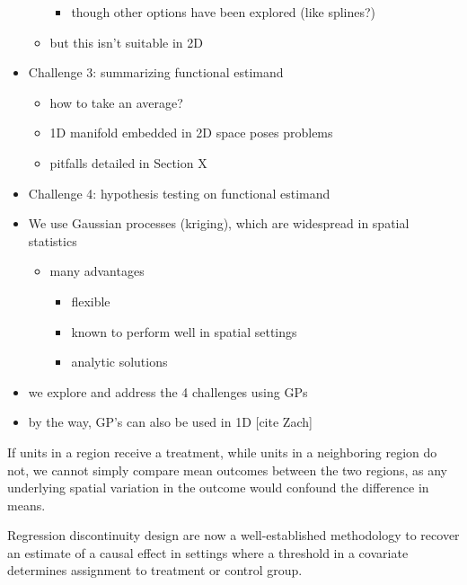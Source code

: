 \documentclass[letter]{article}
\providecommand{\tightlist}{%
      \setlength{\itemsep}{0pt}\setlength{\parskip}{0pt}}
\providecommand{\tightlist}{%
  	  \setlength{\itemsep}{0pt}\setlength{\parskip}{0pt}}
\begin{document}
\begin{itemize}
\begin{itemize}
    \begin{itemize}
    \tightlist
    \item
      though other options have been explored (like splines?)
    \end{itemize}
  \item
    but this isn't suitable in 2D
  \end{itemize}
\item
  Challenge 3: summarizing functional estimand

  \begin{itemize}
  \tightlist
  \item
    how to take an average?
  \item
    1D manifold embedded in 2D space poses problems
  \item
    pitfalls detailed in Section X
  \end{itemize}
\item
  Challenge 4: hypothesis testing on functional estimand
\item
  We use Gaussian processes (kriging), which are widespread in spatial
  statistics

  \begin{itemize}
  \tightlist
  \item
    many advantages

    \begin{itemize}
    \tightlist
    \item
      flexible
    \item
      known to perform well in spatial settings
    \item
      analytic solutions
    \end{itemize}
  \end{itemize}
\item
  we explore and address the 4 challenges using GPs
\item
  by the way, GP's can also be used in 1D {[}cite Zach{]}
\end{itemize}
    


    	If units in a region receive a treatment, while units in a neighboring
region do not, we cannot simply compare mean outcomes between the two
regions, as any underlying spatial variation in the outcome would
confound the difference in means.
    


    	Regression discontinuity design are now a well-established methodology
to recover an estimate of a causal effect in settings where a threshold
in a covariate determines assignment to treatment or control group.
    
\end{document}
